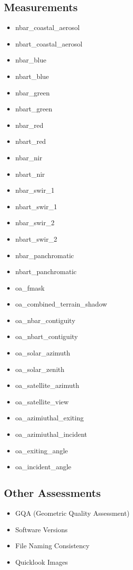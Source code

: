 \documentclass[a4paper]{article}
\begin{document}
    \subsection{Measurements}
      \begin{itemize}
        \item nbar\_coastal\_aerosol
        \item nbart\_coastal\_aerosol
        \item nbar\_blue
        \item nbart\_blue
        \item nbar\_green
        \item nbart\_green
        \item nbar\_red
        \item nbart\_red
        \item nbar\_nir
        \item nbart\_nir
        \item nbar\_swir\_1
        \item nbart\_swir\_1
        \item nbar\_swir\_2
        \item nbart\_swir\_2
        \item nbar\_panchromatic
        \item nbart\_panchromatic
        \item oa\_fmask
        \item oa\_combined\_terrain\_shadow
        \item oa\_nbar\_contiguity
        \item oa\_nbart\_contiguity
        \item oa\_solar\_azimuth
        \item oa\_solar\_zenith
        \item oa\_satellite\_azimuth
        \item oa\_satellite\_view
        \item oa\_azimiuthal\_exiting
        \item oa\_azimiuthal\_incident
        \item oa\_exiting\_angle
        \item oa\_incident\_angle
      \end{itemize}

    \subsection{Other Assessments}
      \begin{itemize}
        \item GQA (Geometric Quality Assessment)
        \item Software Versions
        \item File Naming Consistency
        \item Quicklook Images
      \end{itemize}
\end{document}
